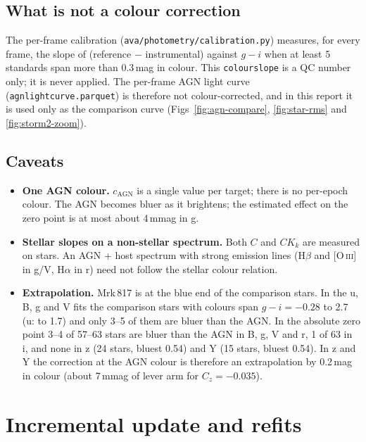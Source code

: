 \documentclass[10pt,a4paper,oneside]{report}
\renewcommand{\_}{\oldunderscore\allowbreak}
\begin{document}
\subsection{What is not a colour correction}

The per-frame calibration (\texttt{ava/photometry/calibration.py}) measures, for every frame, the slope
of (reference $-$ instrumental) against $g-i$ when at least 5 standards span more than 0.3\,mag in
colour. This \texttt{colour\_slope} is a QC number only; it is never applied. The per-frame AGN light
curve (\texttt{agn\_lightcurve.parquet}) is therefore not colour-corrected, and in this report it is
used only as the comparison curve (Figs~\ref{fig:agn-compare}, \ref{fig:star-rms} and \ref{fig:storm2-zoom}).

\subsection{Caveats}

\begin{itemize}
  \item \textbf{One AGN colour.} $c_\mathrm{AGN}$ is a single value per target; there is no per-epoch
        colour. The AGN becomes bluer as it brightens; the estimated effect on the zero point is
        at most about 4\,mmag in g.
  \item \textbf{Stellar slopes on a non-stellar spectrum.} Both $C$ and $CK_k$ are measured on stars.
        An AGN + host spectrum with strong emission lines (H$\beta$ and [O\,\textsc{iii}] in g/V,
        H$\alpha$ in r) need not follow the stellar colour relation.
  \item \textbf{Extrapolation.} Mrk\,817 is at the blue end of the comparison stars. In the u, B, g and V
        fits the comparison stars with colours span $g-i = -0.28$ to 2.7 (u: to 1.7) and only 3--5 of them
        are bluer than the AGN.
        In the absolute zero point 3--4 of 57--63 stars are bluer than the AGN in B, g, V and r, 1 of 63 in
        i, and none in z (24 stars, bluest 0.54) and Y (15 stars, bluest 0.54). In z and Y the
        correction at the AGN colour is therefore an extrapolation by 0.2\,mag in colour
        (about 7\,mmag of lever arm for $C_z = -0.035$).
\end{itemize}

\section{Incremental update and refits}
\label{sec:update}
\end{document}
